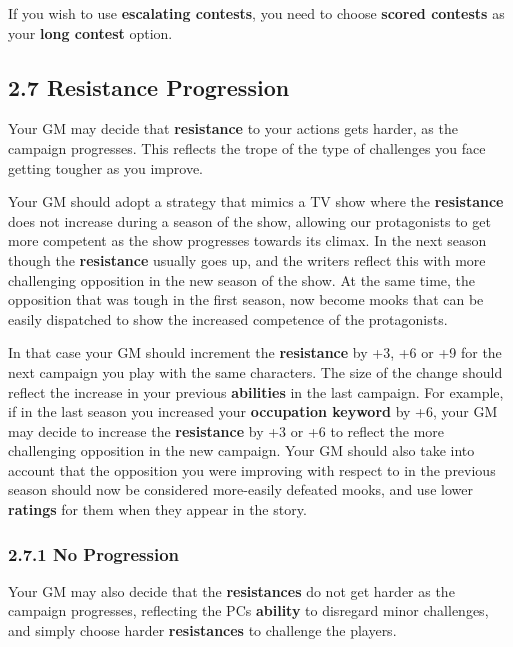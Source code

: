 \documentclass[
]{article}
\begin{document}
If you wish to use \textbf{escalating contests}, you need to choose
\textbf{scored contests} as your \textbf{long contest} option.

\hypertarget{resistance-progression}{%
\subsection{2.7 Resistance Progression}\label{resistance-progression}}

Your GM may decide that \textbf{resistance} to your actions gets harder,
as the campaign progresses. This reflects the trope of the type of
challenges you face getting tougher as you improve.

Your GM should adopt a strategy that mimics a TV show where the
\textbf{resistance} does not increase during a season of the show,
allowing our protagonists to get more competent as the show progresses
towards its climax. In the next season though the \textbf{resistance}
usually goes up, and the writers reflect this with more challenging
opposition in the new season of the show. At the same time, the
opposition that was tough in the first season, now become mooks that can
be easily dispatched to show the increased competence of the
protagonists.

In that case your GM should increment the \textbf{resistance} by +3, +6
or +9 for the next campaign you play with the same characters. The size
of the change should reflect the increase in your previous
\textbf{abilities} in the last campaign. For example, if in the last
season you increased your \textbf{occupation keyword} by +6, your GM may
decide to increase the \textbf{resistance} by +3 or +6 to reflect the
more challenging opposition in the new campaign. Your GM should also
take into account that the opposition you were improving with respect to
in the previous season should now be considered more-easily defeated
mooks, and use lower \textbf{ratings} for them when they appear in the
story.

\hypertarget{no-progression}{%
\subsubsection{2.7.1 No Progression}\label{no-progression}}

Your GM may also decide that the \textbf{resistances} do not get harder
as the campaign progresses, reflecting the PCs \textbf{ability} to
disregard minor challenges, and simply choose harder
\textbf{resistances} to challenge the players.
\end{document}
